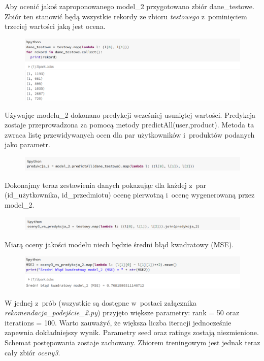 \documentclass[12pt,a4paper]{report}
\begin{document}
Aby ocenić jakoś zaproponowanego model\_2 przygotowano zbiór dane\_testowe. Zbiór ten stanowić będą wszystkie rekordy ze zbioru \textit{testowego} z~pominięciem trzeciej wartości jaką jest ocena.

\begin{figure}[H]
\includegraphics[scale=0.5]{obrazy/ALS9.PNG} 
\end{figure}

Używając modelu\_2 dokonano predykcji wcześniej usuniętej wartości.
Predykcja zostaje przeprowadzona za pomocą metody  predictAll(user,product). Metoda ta zwraca listę przewidywanych ocen dla par użytkowników i~produktów podanych jako parametr.

\begin{figure}[H]
\includegraphics[scale=0.5]{obrazy/ALS10.PNG} 
\end{figure}

Dokonajmy teraz zestawienia danych pokazując dla każdej z~par (id\_użytkownika, id\_przedmiotu) ocenę pierwotną i~ocenę wygenerowaną przez model\_2.

\begin{figure}[H]
\includegraphics[scale=0.5]{obrazy/ALS11.PNG} 
\end{figure}

Miarą oceny jakości modelu niech będzie średni błąd kwadratowy (MSE).

\begin{figure}[H]
\includegraphics[scale=0.5]{obrazy/ALS12.PNG} 
\end{figure}

W jednej z~prób (wszystkie są dostępne w~postaci załącznika \textit{rekomendacja\_podejście\_2.py}) przyjęto większe parametry: rank = 50 oraz iterations = 100. Warto zauważyć, że większa liczba iteracji jednocześnie zapewnia dokładniejszy wynik. Parametry seed oraz ratings zostają niezmienione. Schemat postępowania zostaje zachowany. Zbiorem treningowym jest jednak teraz cały zbiór \textit{oceny3}.
\end{document}
